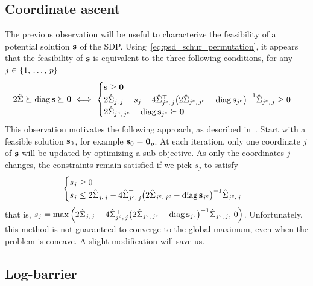 \subsection{Coordinate ascent}\label{subsec:coordinate_ascent}

The previous observation will be useful to characterize the feasibility of a potential solution $\mathbf{s}$ of the SDP\@.
Using~\ref{eq:psd_schur_permutation},
it appears that the feasibility of $\mathbf{s}$ is equivalent to the three following conditions,
for any $j \in \left\{ 1,\, \dots,\, p \right\}$
\begin{equation}\label{eq:schur_sdp_constraints}
    2\hat{\Sigma} \succeq \operatorname*{diag} \mathbf{s} \succeq \mathbf{0}
    \iff
    \begin{cases}
        \mathbf{s} \geq \mathbf{0}\\
        2\hat{\Sigma}_{j,\, j} - s_j
            - 4\hat{\Sigma}_{j^c,\, j}^\top\big( 2\hat{\Sigma}_{j^c,\, j^c} - \operatorname*{diag} \mathbf{s}_{j^c} \big)^{-1}\hat{\Sigma}_{j^c,\, j} \geq 0\\
        2\hat{\Sigma}_{j^c,\, j^c} - \operatorname*{diag} \mathbf{s}_{j^c} \succeq \mathbf{0}
    \end{cases}
\end{equation}
This observation motivates the following approach, as described in~\cite{block_coordinate_sdp}.
Start with a feasible solution $\mathbf{s}_0$, for example $\mathbf{s}_0 = \mathbf{0}_p$.
At each iteration, only one coordinate $j$ of $\mathbf{s}$ will be updated by optimizing
a sub-objective.
As only the coordinates $j$ changes, the constraints remain satisfied if we pick $s_j$ to satisfy
\begin{equation}\label{eq:sdp_simple_constraints}
    \begin{cases}
        s_j \geq 0\\
        s_j \leq 2\hat{\Sigma}_{j,\, j}
            - 4\hat{\Sigma}_{j^c,\, j}^\top\big( 2\hat{\Sigma}_{j^c,\, j^c} - \operatorname*{diag} \mathbf{s}_{j^c} \big)^{-1}\hat{\Sigma}_{j^c,\, j}
    \end{cases}
\end{equation}
that is,
$s_j = \max\Big( 2\hat{\Sigma}_{j,\, j}
    - 4\hat{\Sigma}_{j^c,\, j}^\top\big( 2\hat{\Sigma}_{j^c,\, j^c} - \operatorname*{diag} \mathbf{s}_{j^c} \big)^{-1}\hat{\Sigma}_{j^c,\, j}
    ,\, 0 \Big)
$.
Unfortunately, this method is not guaranteed to converge to the global maximum, even when the problem is concave.
A slight modification will save us.

\subsection{Log-barrier}\label{subsec:log_barrier}

